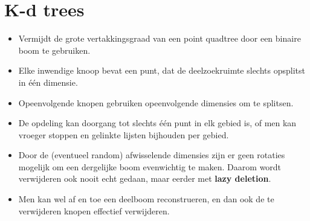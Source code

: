 \section{K-d trees}
\begin{itemize}
    \item Vermijdt de grote vertakkingsgraad van een point quadtree door een binaire boom te gebruiken.
    \item Elke inwendige knoop bevat een punt, dat de deelzoekruimte slechts opsplitst in één dimensie.
    \item Opeenvolgende knopen gebruiken opeenvolgende dimensies om te splitsen.
    \item De opdeling kan doorgang tot slechts één punt in elk gebied is, of men kan vroeger stoppen en gelinkte lijsten bijhouden per gebied.
    \item Door de (eventueel random) afwisselende dimensies zijn er geen rotaties mogelijk om een dergelijke boom evenwichtig te maken. Daarom wordt verwijderen ook nooit echt gedaan, maar eerder met \textbf{lazy deletion}.
    \item Men kan wel af en toe een deelboom reconstrueren, en dan ook de te verwijderen knopen effectief verwijderen.
\end{itemize}